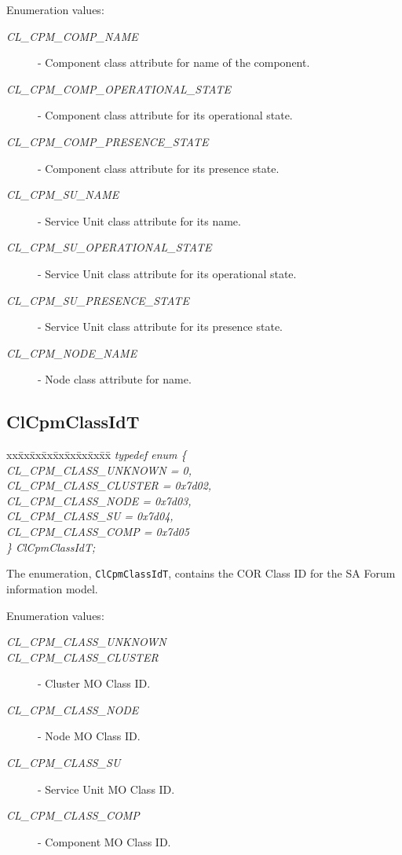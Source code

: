 {\begin{Desc}
\item[Enumeration values:]
\begin{description}
\item[{\em CL\_\-CPM\_\-COMP\_\-NAME}] - Component class attribute for name of the component. 
\item[{\em CL\_\-CPM\_\-COMP\_\-OPERATIONAL\_\-STATE}] - Component class attribute for its operational state. 
\item[{\em CL\_\-CPM\_\-COMP\_\-PRESENCE\_\-STATE}] - Component class attribute for its presence state. 
\item[{\em CL\_\-CPM\_\-SU\_\-NAME}] - Service Unit class attribute for its name. 
\item[{\em CL\_\-CPM\_\-SU\_\-OPERATIONAL\_\-STATE}] - Service Unit class attribute for its operational state. 
\item[{\em CL\_\-CPM\_\-SU\_\-PRESENCE\_\-STATE}] - Service Unit class attribute for its presence state. 
\item[{\em CL\_\-CPM\_\-NODE\_\-NAME}] - Node class attribute for name. 
\end{description}
\end{Desc}



\subsection{ClCpmClassIdT}
 \begin{tabbing}
xx\=xx\=xx\=xx\=xx\=xx\=xx\=xx\=xx\=\kill
\textit{typedef enum \{}\\
\>\>\>\>\textit{CL\_CPM\_CLASS\_UNKNOWN = 0,}\\
\>\>\>\>\textit{CL\_CPM\_CLASS\_CLUSTER = 0x7d02,}\\
\>\>\>\>\textit{CL\_CPM\_CLASS\_NODE = 0x7d03,}\\
\>\>\>\>\textit{CL\_CPM\_CLASS\_SU = 0x7d04,}\\
\>\>\>\>\textit{CL\_CPM\_CLASS\_COMP = 0x7d05}\\
\textit{\} ClCpmClassIdT;}\\
\end{tabbing}
The enumeration, {\tt{ClCpmClassIdT}}, contains the COR Class ID for the SA Forum information model.
\begin{Desc}
\item[Enumeration values: ]\par
\begin{description}
\item[{\em CL\_\-CPM\_\-CLASS\_\-UNKNOWN}]
\item[{\em CL\_\-CPM\_\-CLASS\_\-CLUSTER}] - Cluster MO Class ID. 
\item[{\em CL\_\-CPM\_\-CLASS\_\-NODE}] - Node MO Class ID. 
\item[{\em CL\_\-CPM\_\-CLASS\_\-SU}] - Service Unit MO Class ID. 
\item[{\em CL\_\-CPM\_\-CLASS\_\-COMP}] - Component MO Class ID. 
\end{description}
\end{Desc}

}
